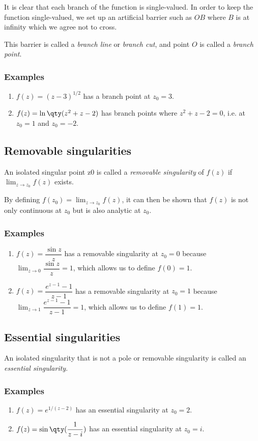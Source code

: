     	It is clear that each branch of the function is single-valued. In order to keep the function single-valued, we set up an artificial barrier such as $OB$ where $B$ is at infinity which we agree not to cross.
    	
    	This barrier is called a \emph{branch line} or \emph{branch cut}, and point $O$ is called a \emph{branch point}.
    	
    	\subsubsection*{Examples}
    		\begin{enumerate}
    			\item $f(z)=(z-3)^{1/2}$ has a branch point at $z_0=3$.
    			
    			\item $f(z)=\ln\qty(z^2+z-2)$ has branch points where $z^2+z-2=0$, i.e. at $z_0=1$ and $z_0=-2$.
    		\end{enumerate}
    	
    \subsection{Removable singularities}
    	An isolated singular point z0 is called a \emph{removable singularity} of $f(z)$ if $\lim_{z\to z_0}{f(z)}$ exists.
    	
    	By defining $f(z_0)=\lim_{z\to z_0}{f(z)}$, it can then be shown that $f(z)$ is not only continuous at $z_0$ but is also analytic at $z_0$.
    	
    	\subsubsection*{Examples}
	    	\begin{enumerate}
	    		\item $f(z)=\dfrac{\sin{z}}{z}$ has a removable singularity at $z_0=0$ because $\lim_{z\to 0}{\dfrac{\sin{z}}{z}}=1$, which allows us to define $f(0)=1$.
	    		
	    		\item $f(z)=\dfrac{e^{z-1}-1}{z-1}$ has a removable singularity at $z_0=1$ because $\lim_{z\to 1}{\dfrac{e^{z-1}-1}{z-1}}=1$, which allows us to define $f(1)=1$.
	    	\end{enumerate}
    
    \subsection{Essential singularities}
    	An isolated singularity that is not a pole or removable singularity is called an \emph{essential singularity}.
    	
    	\subsubsection*{Examples}
    		\begin{enumerate}
    			\item $f(z)=e^{1/(z-2)}$ has an essential singularity at $z_0=2$.
    			
    			\item $f(z)=\sin\qty(\dfrac{1}{z-i})$ has an essential singularity at $z_0=i$.
    		\end{enumerate}